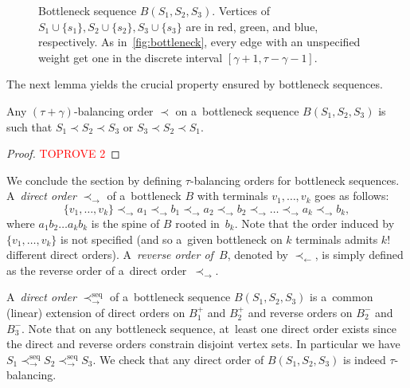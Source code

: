 \documentclass[a4paper,UKenglish,cleveref,hyperref,autoref]{lipics-v2021}
\begin{document}
\begin{figure}[h!]
  \caption{Bottleneck sequence $B(S_1,S_2,S_3)$.
    Vertices of $S_1 \cup \{s_1\}, S_2 \cup \{s_2\}, S_3 \cup \{s_3\}$ are in red, green, and blue, respectively.
    As in~\cref{fig:bottleneck}, every edge with an unspecified weight get one in the discrete interval $[\gamma+1,\tau-\gamma-1]$.}
\label{fig:bottleneck-sequence}
\end{figure}
The next lemma yields the crucial property ensured by bottleneck sequences.

\begin{lemma}\label{lem:Forcing-the-order}
Any $(\tau + \gamma)$-balancing order $\prec$ on a~bottleneck sequence $B(S_1, S_2, S_3)$ is such that $S_1 \prec S_2 \prec S_3$ or $S_3 \prec S_2 \prec S_1$.
\end{lemma}
\begin{proof}\textcolor{red}{TOPROVE 2}\end{proof}

We conclude the section by defining $\tau$-balancing orders for bottleneck sequences.
A~\emph{direct order} $\prec_{\rightarrow}$ of a~bottleneck $B$ with terminals $v_1, \dots, v_k$ goes as follows:
$$
\{v_1, \dots, v_k\} \prec_{\rightarrow} a_1 \prec_{\rightarrow} b_1 \prec_{\rightarrow} a_2 \prec_{\rightarrow} b_2 \prec_{\rightarrow} \dots \prec_{\rightarrow} a_k \prec_{\rightarrow} b_k,
$$
where $a_1b_2 \dots a_kb_k$ is the spine of $B$ rooted in~$b_k$.
Note that the order induced by $\{v_1, \dots, v_k\}$ is not specified (and so a~given bottleneck on $k$ terminals admits $k!$ different direct orders).
A~\emph{reverse order of~$B$}, denoted by $\prec_{\leftarrow}$, is simply defined as the reverse order of a~direct order~$\prec_{\rightarrow}$.

A~\emph{direct order} $\prec^\text{seq}_{\rightarrow}$ of a~bottleneck sequence $B(S_1, S_2, S_3)$ is a~common (linear) extension of direct orders on $B_1^+$ and $B_2^+$ and reverse orders on $B_2^-$ and $B_3^-$.
Note that on any bottleneck sequence, at~least one direct order exists since the direct and reverse orders constrain disjoint vertex sets. 
In particular we have $S_1 \prec^\text{seq}_{\rightarrow} S_2 \prec^\text{seq}_{\rightarrow} S_3$.
We check that any direct order of $B(S_1, S_2, S_3)$ is indeed $\tau$-balancing.
\end{document}
